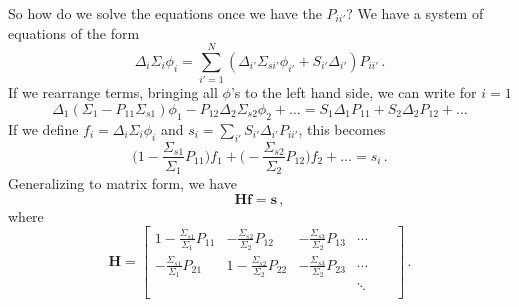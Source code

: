 So how do we solve the equations once we have the $P_{ii'}$?  We have a system of equations of the form
\begin{equation}
 \Delta_i \Sigma_i \phi_i = \sum^N_{i'=1} ( \Delta_{i'} \Sigma_{si'}\phi_{i'} + S_{i'}\Delta_{i'})P_{ii'} \, .
\end{equation}
If we rearrange terms, bringing all $\phi$'s to the left hand side, we can write for $i=1$
\begin{equation}
 \Delta_1 ( \Sigma_1 - P_{11}\Sigma_{s1} ) \phi_1 - P_{12} \Delta_2 \Sigma_{s2} \phi_2 + \ldots =  S_{1}\Delta_{1}P_{11} + S_{2} \Delta_2 P_{12} + \ldots 
\end{equation}
If we define $f_i = \Delta_i \Sigma_i \phi_i$ and $s_i = \sum_{i'} S_{i'}\Delta_{i'}P_{ii'}$, this becomes
\begin{equation}
\Big ( 1-\frac{\Sigma_{s1}}{\Sigma_{1}}P_{11} \Big ) f_1 + \Big ( -\frac{\Sigma_{s2}}{\Sigma_2}P_{12} \Big ) f_2 + \ldots =  s_i \, .
\end{equation}
Generalizing to matrix form, we have
\begin{equation}
  \mathbf{ H } \mathbf{ f } = \mathbf{ s } \, ,
  \label{eq:cpmmatrix}
\end{equation}
where
\begin{equation}
 \mathbf{H} = 	\left
	[\begin{array}{cccccc}
    1-\frac{\Sigma_{s1}}{\Sigma_{1}}P_{11} & -\frac{\Sigma_{s2}}{\Sigma_2}P_{12} &  -\frac{\Sigma_{s3}}{\Sigma_2}P_{13} & \cdots & & \\
     -\frac{\Sigma_{s1}}{\Sigma_{1}}P_{21} &1-\frac{\Sigma_{s2}}{\Sigma_2}P_{22} &  -\frac{\Sigma_{s3}}{\Sigma_2}P_{23} & \cdots & & \\
	    &       &        & \ddots    &    &      \\
	\end{array} 
	\right ] \, .
\end{equation}

